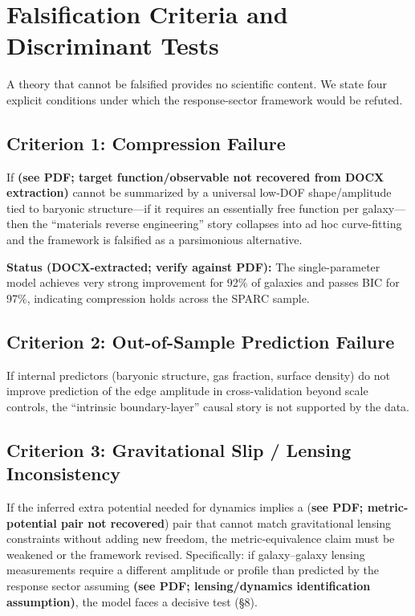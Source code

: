\section{Falsification Criteria and Discriminant Tests}

A theory that cannot be falsified provides no scientific content. We state four explicit conditions under which the response-sector framework would be refuted.

\subsection{Criterion 1: Compression Failure}

If \textbf{(see PDF; target function/observable not recovered from DOCX extraction)} cannot be summarized by a universal low-DOF shape/amplitude tied to baryonic structure---if it requires an essentially free function per galaxy---then the ``materials reverse engineering'' story collapses into ad hoc curve-fitting and the framework is falsified as a parsimonious alternative.

\textbf{Status (DOCX-extracted; verify against PDF):} The single-parameter model achieves very strong improvement for 92\% of galaxies and passes BIC for 97\%, indicating compression holds across the SPARC sample.

\subsection{Criterion 2: Out-of-Sample Prediction Failure}

If internal predictors (baryonic structure, gas fraction, surface density) do not improve prediction of the edge amplitude in cross-validation beyond scale controls, the ``intrinsic boundary-layer'' causal story is not supported by the data.

\subsection{Criterion 3: Gravitational Slip / Lensing Inconsistency}

If the inferred extra potential needed for dynamics implies a (\textbf{see PDF; metric-potential pair not recovered}) pair that cannot match gravitational lensing constraints without adding new freedom, the metric-equivalence claim must be weakened or the framework revised. Specifically: if galaxy--galaxy lensing measurements require a different amplitude or profile than predicted by the response sector assuming \textbf{(see PDF; lensing/dynamics identification assumption)}, the model faces a decisive test (\S8).

